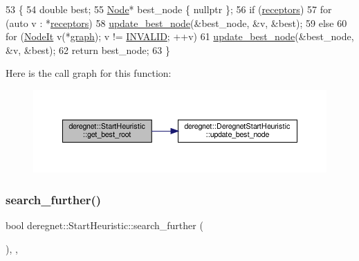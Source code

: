 \begin{DoxyCode}
53                                     \{
54     \textcolor{keywordtype}{double} best;
55     \hyperlink{namespacederegnet_a744bad34f2de9856d36715a445f027f3}{Node}* best\_node \{ \textcolor{keyword}{nullptr} \};
56     \textcolor{keywordflow}{if} (\hyperlink{classderegnet_1_1DeregnetStartHeuristic_ab80c046ff2b7c64086fceb84987b3e50}{receptors})
57         \textcolor{keywordflow}{for} (\textcolor{keyword}{auto} v : *\hyperlink{classderegnet_1_1DeregnetStartHeuristic_ab80c046ff2b7c64086fceb84987b3e50}{receptors})
58             \hyperlink{classderegnet_1_1DeregnetStartHeuristic_a50179ff9db4d416b93ff41d1dcee1358}{update\_best\_node}(&best\_node, &v, &best);
59     \textcolor{keywordflow}{else}
60         \textcolor{keywordflow}{for} (\hyperlink{namespacederegnet_ac34314e1b5f456fc6d1bb9d96316de4a}{NodeIt} v(*\hyperlink{classderegnet_1_1DeregnetStartHeuristic_a4da8e53fc7c0fa3dbe0e3ef07296d75e}{graph}); v != \hyperlink{usinglemon_8hpp_adf770fe2eec438e3758ffe905dbae208}{INVALID}; ++v)
61             \hyperlink{classderegnet_1_1DeregnetStartHeuristic_a50179ff9db4d416b93ff41d1dcee1358}{update\_best\_node}(&best\_node, &v, &best);
62     \textcolor{keywordflow}{return} best\_node;
63 \}
\end{DoxyCode}
Here is the call graph for this function\+:\nopagebreak
\begin{figure}[H]
\begin{center}
\leavevmode
\includegraphics[width=350pt]{classderegnet_1_1StartHeuristic_a84ed02caf211e22b663e4e3c0d5b4f24_cgraph}
\end{center}
\end{figure}
\mbox{\label{classderegnet_1_1StartHeuristic_acbc34cb7479d3e68d6ef0554b739fc52}} 
\subsubsection{\texorpdfstring{search\+\_\+further()}{search\_further()}}
{\footnotesize\ttfamily bool deregnet\+::\+Start\+Heuristic\+::search\+\_\+further (\begin{DoxyParamCaption}{ }\end{DoxyParamCaption})\hspace{0.3cm}{\ttfamily [override]}, {\ttfamily [private]}, {\ttfamily [virtual]}}



